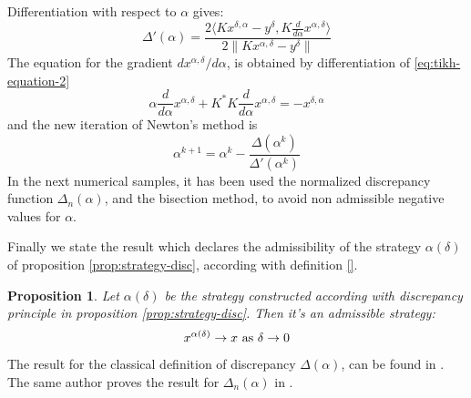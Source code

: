 \documentclass[10pt, a4paper, twoside, openright]{book}
\theoremstyle{definition}
\theoremstyle{plain}
\theoremstyle{plain}
\theoremstyle{plain}
\newtheorem{proposition}[subsection]{Proposition}
\theoremstyle{plain}
\theoremstyle{plain}
\theoremstyle{plain}
\theoremstyle{plain}
\theoremstyle{plain}
\begin{document}
Differentiation with respect to $\alpha$ gives:
\begin{equation}
 \Delta'(\alpha) = \dfrac{2 \langle  Kx^{\delta, \alpha} - y^\delta, K\frac{d}{d\alpha}x^{\alpha, \delta}\rangle}{2\|Kx^{\alpha,\delta} - y^\delta\|}
\end{equation}
The equation for the gradient $dx^{\alpha,\delta}/d\alpha$, is obtained by differentiation of \ref{eq:tikh-equation-2}
\begin{equation}
 \alpha\frac{d}{d\alpha}x^{\alpha, \delta} + K^*K\frac{d}{d\alpha}x^{\alpha, \delta} = -x^{\delta, \alpha}
\end{equation}
and the new iteration of Newton's method is
\begin{equation}
 \alpha^{k+1} = \alpha^k - \frac{\Delta(\alpha^k)}{\Delta'(\alpha^k)}
\end{equation}
In the next numerical samples, it has been used the normalized discrepancy function $\Delta_n(\alpha)$, and the bisection method, to avoid non admissible negative values for $\alpha$.
\par
Finally we state the result which declares the admissibility of the strategy $\alpha(\delta)$ of proposition \ref{prop:strategy-disc}, according with definition \ref{}.
\begin{proposition}
 Let $\alpha(\delta)$ be the strategy constructed according with discrepancy principle in proposition \ref{prop:strategy-disc}. Then it's an admissible strategy:
 \begin{equation}
  x^{\alpha(\delta)}\to x \textup{ as }\delta\to0
 \end{equation}
\end{proposition}
The result for the classical definition of discrepancy $\Delta(\alpha)$, can be found in \cite{kirsch:book}. The same author proves the result for $\Delta_n(\alpha)$ in \cite{kirsch:shape-1998}.
\end{document}
